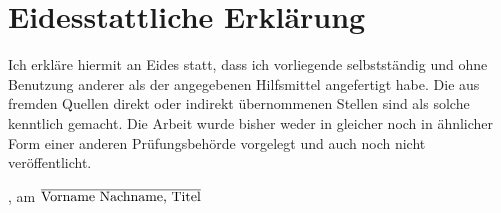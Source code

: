 \chapter*{Eidesstattliche Erklärung}
\thispagestyle{empty}
Ich erkläre hiermit an Eides statt, dass ich vorliegende \mykindofthesis{} selbstständig und ohne Benutzung anderer als der angegebenen Hilfsmittel angefertigt habe. Die aus fremden Quellen direkt oder indirekt übernommenen Stellen sind als solche kenntlich gemacht. Die Arbeit wurde bisher weder in gleicher noch in ähnlicher Form einer anderen Prüfungsbehörde vorgelegt und auch noch nicht veröffentlicht.

\vspace*{50mm}

\mysubmissiontown{}, am \mysubmissionday{} \mysubmissionmonth{} \mysubmissionyear{}\hfill$\overline{\hbox{Vorname Nachname, Titel{}}}$
